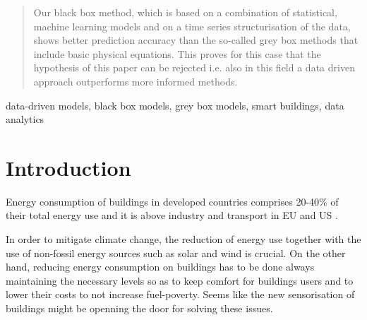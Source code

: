\documentclass[10pt, conference, compsocconf]{IEEEtran}
\begin{document}
\begin{abstract}

Our black box method, which is based on a combination of statistical, machine learning models and on a time series structurisation of the data, shows better prediction accuracy than the so-called grey box methods that include basic physical equations. This proves for this case that the hypothesis of this paper can be rejected i.e. also in this field a data driven approach outperforms more informed methods.

\end{abstract}

\begin{IEEEkeywords}
data-driven models, black box models, grey box models, smart buildings, data analytics

\end{IEEEkeywords}


%
\IEEEpeerreviewmaketitle



\section{Introduction} \label{intro}

Energy consumption of buildings in developed countries comprises 20-40\% of their total energy use and it is above industry and transport in EU and US \cite{perez2008review, energyUS}. 

In order to mitigate climate change, the reduction of energy use together with the use of non-fossil energy sources such as solar and wind is crucial. On the other hand, reducing energy consumption on buildings has to be done always maintaining the necessary levels so as to keep comfort for buildings users and to lower their costs to not increase fuel-poverty. Seems like the new sensorisation of buildings might be openning the door for solving these issues.
\end{document}

